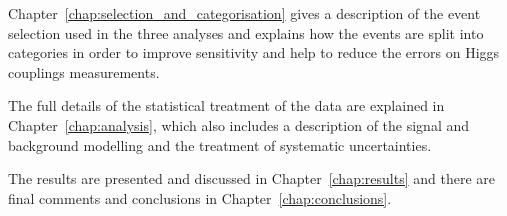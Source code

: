 Chapter~\ref{chap:selection_and_categorisation} gives a description of the event selection used in the three analyses and explains how the events are split into categories in order to improve sensitivity and help to reduce the errors on Higgs couplings measurements.

The full details of the statistical treatment of the data are explained in Chapter~\ref{chap:analysis}, which also includes a description of the signal and background modelling and the treatment of systematic uncertainties.

The results are presented and discussed in Chapter~\ref{chap:results} and there are final comments and conclusions in Chapter~\ref{chap:conclusions}.

